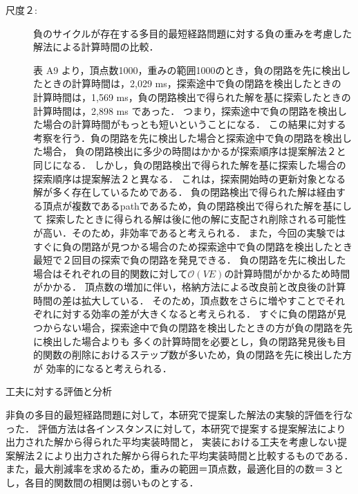 \documentclass[12pt]{optlab-bachelor}
\begin{document}
\begin{description}
  \item[尺度２:]
  負のサイクルが存在する多目的最短経路問題に対する負の重みを考慮した解法による計算時間の比較．

  表 A9 より，頂点数1000，重みの範囲1000のとき，負の閉路を先に検出したときの計算時間は，2,029 ms，探索途中で負の閉路を検出したときの
  計算時間は，1,569 ms，負の閉路検出で得られた解を基に探索したときの計算時間は，2,898 ms であった．
  つまり，探索途中で負の閉路を検出した場合の計算時間がもっとも短いということになる．
  この結果に対する考察を行う．負の閉路を先に検出した場合と探索途中で負の閉路を検出した場合，
  負の閉路検出に多少の時間はかかるが探索順序は提案解法２と同じになる．
  しかし，負の閉路検出で得られた解を基に探索した場合の探索順序は提案解法２と異なる．
  これは，探索開始時の更新対象となる解が多く存在しているためである．
  負の閉路検出で得られた解は経由する頂点が複数であるpathであるため，負の閉路検出で得られた解を基にして
  探索したときに得られる解は後に他の解に支配され削除される可能性が高い．そのため，非効率であると考えられる．
  また，今回の実験ではすぐに負の閉路が見つかる場合のため探索途中で負の閉路を検出したとき最短で２回目の探索で負の閉路を発見できる．
  負の閉路を先に検出した場合はそれぞれの目的関数に対して$\mathcal{O}(VE)$の計算時間がかかるため時間がかかる．
  頂点数の増加に伴い，格納方法による改良前と改良後の計算時間の差は拡大している．
  そのため，頂点数をさらに増やすことでそれぞれに対する効率の差が大きくなると考えられる．
  すぐに負の閉路が見つからない場合，探索途中で負の閉路を検出したときの方が負の閉路を先に検出した場合よりも
  多くの計算時間を必要とし，負の閉路発見後も目的関数の削除におけるステップ数が多いため，負の閉路を先に検出した方が
  効率的になると考えられる．

\end{description}

\begin{description}
  \item[工夫に対する評価と分析]
\end{description}

非負の多目的最短経路問題に対して，本研究で提案した解法の実験的評価を行なった．
評価方法は各インスタンスに対して，本研究で提案する提案解法により出力された解から得られた平均実装時間と，
実装における工夫を考慮しない提案解法２により出力された解から得られた平均実装時間と比較するものである．
また，最大削減率を求めるため，重みの範囲＝頂点数，最適化目的の数＝３とし，各目的関数間の相関は弱いものとする．
\end{document}
